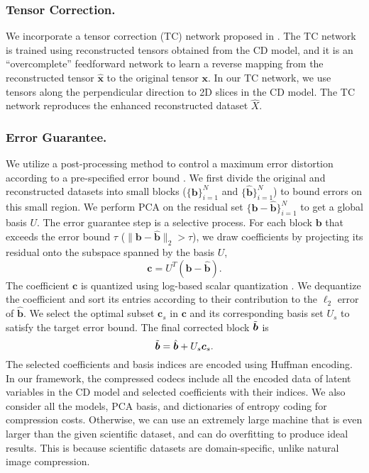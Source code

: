 \subsubsection{Tensor Correction.}
We incorporate a tensor correction (TC) network proposed in \cite{JL-S3D_arxiv}. The TC network is trained using reconstructed tensors obtained from the CD model, and it is an ``overcomplete'' feedforward network to learn a reverse mapping from the reconstructed tensor $\hat{\boldsymbol{x}}$ to the original tensor $\boldsymbol{x}$. In our TC network, we use tensors along the perpendicular direction to 2D slices in the CD model. The TC network reproduces the enhanced reconstructed dataset $\hat{X}$.
\subsubsection{Error Guarantee.}
We utilize a post-processing method to control a maximum error distortion according to a pre-specified error bound \cite{JL-GAE,JL-S3D_arxiv}. We first divide the original and reconstructed datasets into small blocks ($\{\boldsymbol{b}\}_{i=1}^N$ and $\{\hat{\boldsymbol{b}}\}_{i=1}^N$) to bound errors on this small region. We perform PCA on the residual set $\{\boldsymbol{b}-\hat{\boldsymbol{b}}\}_{i=1}^N$ to get a global basis $U$. The error guarantee step is a selective process. For each block $\boldsymbol{b}$ that exceeds the error bound $\tau$ ($\|\boldsymbol{b}-\hat{\boldsymbol{b}}\|_{2}> \tau$), we draw coefficients by projecting its residual onto the subspace spanned by the basis $U$,
\begin{equation}
    \boldsymbol{c}=U^T\left(\boldsymbol{b}-\hat{\boldsymbol{b}}\right).
\end{equation}
The coefficient $\boldsymbol{c}$ is quantized using log-based scalar quantization \cite{JL-S3D_arxiv}. We dequantize the coefficient and sort its entries according to their contribution to the $\ell_2$ error of $\hat{\boldsymbol{b}}$. We select the optimal subset $\boldsymbol{c}_s$ in $\boldsymbol{c}$ and its corresponding basis set $U_s$ to satisfy the target error bound. The final corrected block $\Tilde{\boldsymbol{b}}$ is
\begin{equation}
    \Tilde{\boldsymbol{b}}=\hat{\boldsymbol{b}}+U_{s}\boldsymbol{c}_{s}.
\end{equation}
The selected coefficients and basis indices are encoded using Huffman encoding. In our framework, the compressed codecs include all the encoded data of latent variables in the CD model and selected coefficients with their indices. We also consider all the models, PCA basis, and dictionaries of entropy coding for compression costs. Otherwise, we can use an extremely large machine that is even larger than the given scientific dataset, and can do overfitting to produce ideal results. This is because scientific datasets are domain-specific, unlike natural image compression.